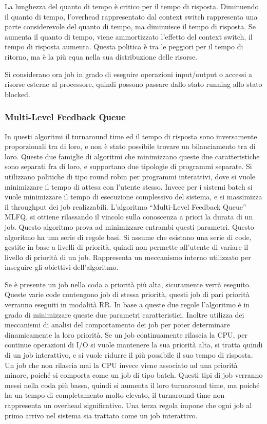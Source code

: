\documentclass{article}
\numberwithin{equation}{subsection}
\begin{document}
La lunghezza del quanto di tempo è critico per il tempo di risposta. Diminuendo il quanto di tempo, l'overhead rappresentato dal context switch rappresenta una parte 
considerevole del quanto di tempo, ma diminuisce il tempo di risposta. Se aumenta il quanto di tempo, viene ammortizzato l'effetto del context switch, il tempo di 
risposta aumenta. 
Questa politica è tra le peggiori per il tempo di ritorno, ma è la più equa nella sua distribuzione delle risorse. 


Si considerano ora job in grado di eseguire operazioni input/output o accessi a risorse esterne al processore, quindi possono passare dallo stato running allo stato 
blocked. 


\subsubsection{Multi-Level Feedback Queue}

In questi algoritmi il turnaround time ed il tempo di risposta sono inversamente proporzionali tra di loro, e non è stato possibile trovare un bilanciamento tra di loro. 
Queste due famiglie di algoritmi che minimizzano queste due caratteristiche sono separati fra di loro, e supportano due tipologie di programmi separate. Si utilizzano 
politiche di tipo round robin per programmi interattivi, dove si vuole minimizzare il tempo di attesa con l'utente stesso. Invece per i sistemi batch si vuole 
minimizzare il tempo di esecuzione complessivo del sistema, e si massimizza il throughput dei job realizzabili. 
L'algoritmo ``Multi-Level Feedback Queue'' MLFQ, si ottiene rilassando il vincolo sulla conoscenza a priori la durata di un job. Questo algoritmo prova ad minimizzare 
entrambi questi parametri. 
Questo algoritmo ha una serie di regole basi. Si assume che esistano una serie di code, gestite in base a livelli di priorità, quindi non permette all'utente di 
variare il livello di priorità di un job. Rappresenta un meccanismo interno utilizzato per inseguire gli obiettivi dell'algoritmo. 

Se è presente un job nella coda a priorità più alta, sicuramente verrà eseguito. Queste varie code contengono job di stessa priorità, questi job di pari priorità 
verranno eseguiti in modalità RR. 
In base a queste due regole l'algoritmo è in grado di minimizzare queste due parametri caratteristici. Inoltre utilizza dei meccanismi di analisi del comportamento 
dei job per poter determinare dinamicamente la loro priorità. 
Se un job continuamente rilascia la CPU, per continue operazioni di I/O si vuole mantenere la sua priorità alta, si tratta quindi di un job interattivo, e si vuole 
ridurre il più possibile il suo tempo di risposta. Un job che non rilascia mai la CPU invece viene associato ad una priorità minore, poiché si comporta come un job di 
tipo batch. Questi tipi di job verranno messi nella coda più bassa, quindi si aumenta il loro turnaround time, ma poiché ha un tempo di completamento molto elevato, il 
turnaround time non rappresenta un overhead significativo. 
Una terza regola impone che ogni job al primo arrivo nel sistema sia trattato come un job interattivo. 
\end{document}
